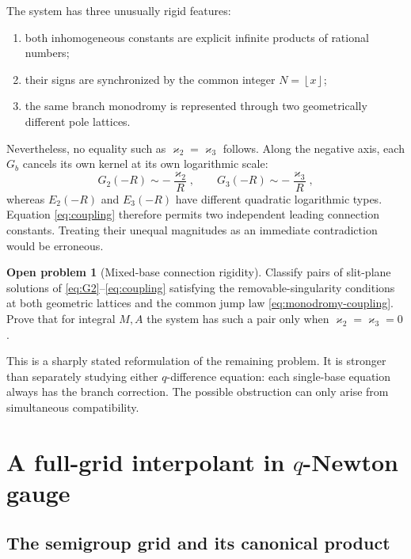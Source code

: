 \documentclass[11pt]{article}
\theoremstyle{definition}
\newtheorem{problem}[theorem]{Open problem}
\newcommand{\kk}{\varkappa}
\newcommand{\floor}[1]{\left\lfloor #1\right\rfloor}
\begin{document}
The system has three unusually rigid features:
\begin{enumerate}
  \item both inhomogeneous constants are explicit infinite products of rational numbers;
  \item their signs are synchronized by the common integer $N=\floor{x}$;
  \item the same branch monodromy is represented through two geometrically different pole lattices.
\end{enumerate}
Nevertheless, no equality such as $\kk_2=\kk_3$ follows.  Along the negative axis, each $G_b$ cancels its own kernel at its own logarithmic scale:
\[
 G_2(-R)\sim-\frac{\kk_2}{R},\qquad
 G_3(-R)\sim-\frac{\kk_3}{R},
\]
whereas $E_2(-R)$ and $E_3(-R)$ have different quadratic logarithmic types.  Equation \eqref{eq:coupling} therefore permits two independent leading connection constants.  Treating their unequal magnitudes as an immediate contradiction would be erroneous.

\begin{problem}[Mixed-base connection rigidity]\label{prob:mixed-connection}
Classify pairs of slit-plane solutions of \eqref{eq:G2}--\eqref{eq:coupling} satisfying the removable-singularity conditions at both geometric lattices and the common jump law \eqref{eq:monodromy-coupling}.  Prove that for integral $M,A$ the system has such a pair only when $\kk_2=\kk_3=0$.
\end{problem}

This is a sharply stated reformulation of the remaining problem.  It is stronger than separately studying either $q$-difference equation: each single-base equation always has the branch correction.  The possible obstruction can only arise from simultaneous compatibility.

\section{A full-grid interpolant in $q$-Newton gauge}

\subsection{The semigroup grid and its canonical product}
\end{document}
